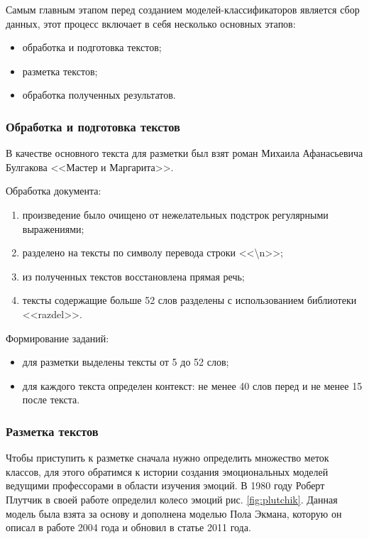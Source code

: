 Самым главным этапом перед созданием моделей-классификаторов является сбор данных, этот процесс включает в себя несколько основных этапов:

\bigskip
\begin{itemize}
 \item обработка и подготовка текстов;
 \item разметка текстов;
 \item обработка полученных результатов.
\end{itemize}

\subsubsection{Обработка и подготовка текстов}

В качестве основного текста для разметки был взят роман Михаила Афанасьевича Булгакова <<Мастер и Маргарита>>.

\bigskip
Обработка документа:

\bigskip
\begin{enumerate}
\item произведение было очищено от нежелательных подстрок регулярными выражениями;
\item разделено на тексты по символу перевода строки <<\textbackslash n>>;
\item из полученных текстов восстановлена прямая речь;
\item тексты содержащие больше 52 слов разделены с использованием библиотеки <<razdel>>.
\end{enumerate}

\bigskip
Формирование заданий:

\bigskip
\begin{itemize}
 \item для разметки выделены тексты от 5 до 52 слов;
 \item для каждого текста определен контекст:  не менее 40 слов перед и не менее 15 после текста.
\end{itemize}



\subsubsection{Разметка текстов}

Чтобы приступить к разметке сначала нужно определить множество меток классов, для этого обратимся к истории создания эмоциональных моделей ведущими профессорами в области изучения эмоций. В 1980 году Роберт Плутчик в своей работе \cite{Plutchik} определил колесо эмоций рис. \ref{fig:plutchik}. Данная модель была взята за основу и дополнена моделью Пола Экмана, которую он описал в работе \cite{Ekman2004} 2004 года и обновил в статье \cite{Ekman2011} 2011 года.

